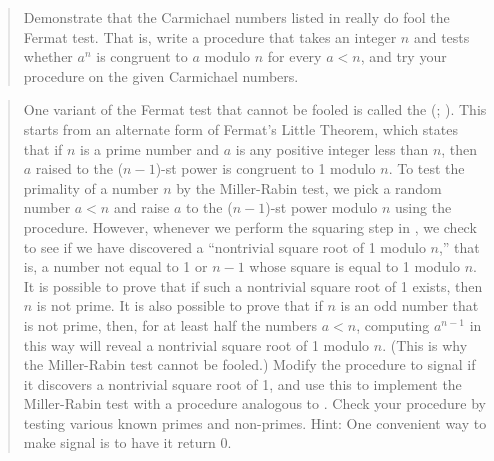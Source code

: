 \begin{quote}
 Demonstrate that the Carmichael
numbers listed in  really do fool the Fermat test.  That is,
write a procedure that takes an integer \( n \) and tests whether \( a^n \) is
congruent to \( a \) modulo \( n \) for every \( a < n \), and try your procedure
on the given Carmichael numbers.
\end{quote}

\begin{quote}
 One variant of the Fermat test
that cannot be fooled is called the  (;
).  This starts from an alternate form of Fermat's Little Theorem,
which states that if \( n \) is a prime number and \( a \) is any positive integer
less than \( n \), then \( a \) raised to the (\( n-1 \))-st power is congruent to 1
modulo \( n \).  To test the primality of a number \( n \) by the Miller-Rabin
test, we pick a random number \( a < n \) and raise \( a \) to the (\( n-1 \))-st
power modulo \( n \) using the  procedure.  However, whenever we
perform the squaring step in , we check to see if we have
discovered a ``nontrivial square root of 1 modulo \( n \),'' that is, a number
not equal to 1 or \( n-1 \) whose square is equal to 1 modulo \( n \).  It is
possible to prove that if such a nontrivial square root of 1 exists, then \( n \)
is not prime.  It is also possible to prove that if \( n \) is an odd number that
is not prime, then, for at least half the numbers \( a < n \), computing
\( a^{n-1} \) in this way will reveal a nontrivial square root of 1 modulo
\( n \).  (This is why the Miller-Rabin test cannot be fooled.)  Modify the
 procedure to signal if it discovers a nontrivial square root of
1, and use this to implement the Miller-Rabin test with a procedure analogous
to .  Check your procedure by testing various known primes
and non-primes.  Hint: One convenient way to make  signal is to
have it return 0.
\end{quote}
